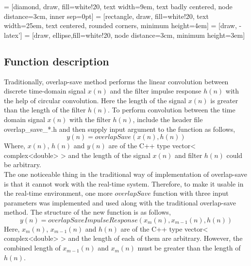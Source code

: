 \begin{refsection}
%


 = [diamond, draw, fill=white!20, 
text width=9em, text badly centered, node distance=3cm, inner sep=0pt]
 = [rectangle, draw, fill=white!20,
text width=25em, text centered, rounded corners, minimum height=4em]
 = [draw, -latex']
 = [draw, ellipse,fill=white!20, node distance=3cm,
minimum height=3em]

\newpage
\subsection*{Function description}
Traditionally, overlap-save method performs the linear convolution between discrete time-domain signal $x(n)$ and the filter impulse response $h(n)$ with the help of circular convolution. Here the length of the signal $x(n)$ is greater than the length of the filter $h(n)$.
To perform convolution between the time domain signal $x(n)$ with the filter $h(n)$, include the header file overlap\_save\_*.h and then supply input argument to the function as follows,
 \begin{equation*}
 y(n) = overlapSave(x(n),h(n))
 \end{equation*}
Where, $x(n)$, $h(n)$ and $y(n)$ are of the C++ type vector< complex<double> > and the length of the signal $x(n)$ and filter  $h(n)$ could be arbitrary.\\
The one noticeable thing in the traditional way of implementation of overlap-save is that it cannot work with the real-time system. Therefore, to make it usable in the real-time environment, one more $overlapSave$ function with three input parameters was implemented and used along with the traditional overlap-save method. The structure of the new function is as follows,
 \begin{equation*}
y(n) =overlapSaveImpulseResponse(x_{m}(n), x_{m-1}(n), h(n))
\end{equation*}
Here, $x_{m}(n)$, $x_{m-1}(n)$ and $h(n)$ are of the C++ type vector< complex<double> > and the length of each of them are arbitrary. However, the combined length of $x_{m-1}(n)$ and $x_{m}(n)$ must be greater than the length of $h(n)$.

\end{refsection}
